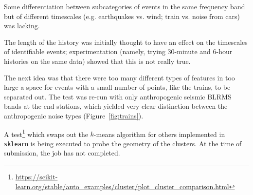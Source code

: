 \documentclass[colorlinks=true,pdfstartview=FitV,linkcolor=blue,
            citecolor=red,urlcolor=magenta]{ligodoc}
\begin{document}
Some differentiation between subcategories of events in the same frequency band but of different timescales (e.g. earthquakes vs. wind; train vs. noise from cars) was lacking.

The length of the history was initially thought to have an effect on the timescales of identifiable events; experimentation (namely, trying 30-minute and 6-hour histories on the same data) showed that this is not really true.

The next idea was that there were too many different types of features in too large a space for events with a small number of points, like the trains, to be separated out.
The test was re-run with only anthropogenic seismic BLRMS bands at the end stations, which yielded very clear distinction between the anthropogenic noise types (Figure~\ref{fig:trains}).

A test\footnote{\url{https://scikit-learn.org/stable/auto_examples/cluster/plot_cluster_comparison.html}} which swaps out the $k$-means algorithm for others implemented in \texttt{sklearn} is being executed to probe the geometry of the clusters.
At the time of submission, the job has not completed.


\newcommand\rightfigures[2]{
  \begin{figure}
  \begin{minipage}[t]{0.3\textwidth}
    #2
  \end{minipage}\hfill
  \begin{minipage}[c]{0.67\textwidth}
    \begin{tabular}{c}
      #1
    \end{tabular}
  \end{minipage}
\end{figure}
}

\newcommand\leftfigures[2]{
\begin{figure}
  \begin{minipage}[c]{0.67\textwidth}
    \begin{tabular}{c}
      #1
    \end{tabular}
  \end{minipage}\hfill
  \begin{minipage}[t]{0.3\textwidth}
    #2
  \end{minipage}
\end{figure}
}
\end{document}
